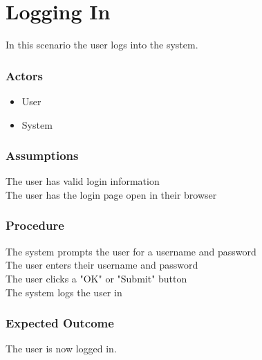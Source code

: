\section{Logging In}

In this scenario the user logs into the system.

\subsubsection{Actors}
\begin{itemize}
	\item User
	\item System
\end{itemize}

\subsubsection{Assumptions}

The user has valid login information\\
The user has the login page open in their browser

\subsubsection{Procedure}

The system prompts the user for a username and password\\
The user enters their username and password\\
The user clicks a "OK" or "Submit" button\\
The system logs the user in

\subsubsection{Expected Outcome}

The user is now logged in.